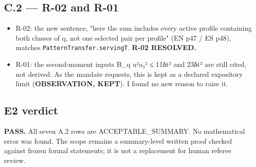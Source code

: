 \documentclass[
]{article}
\providecommand{\tightlist}{%
  \setlength{\itemsep}{0pt}\setlength{\parskip}{0pt}}
\begin{document}
\subsection{C.2 --- R-02 and R-01}\label{c2--r-02-and-r-01}

\begin{itemize}
\tightlist
\item
  R-02: the new sentence, "here the sum includes every active profile
  containing both classes of q, not one selected pair per profile" (EN
  p47 / ES p48), matches \texttt{PatternTransfer.servingT}. \textbf{R-02
  RESOLVED.}
\item
  R-01: the second-moment inputs B\_q u²a₃² ≤ 11δt² and 23δt² are still
  cited, not derived. As the mandate requests, this is kept as a
  declared expository limit (\textbf{OBSERVATION, KEPT}). I found no new
  reason to raise it.
\end{itemize}

\subsection{E2 verdict}\label{e2-verdict}

\textbf{PASS.} All seven A.2 rows are ACCEPTABLE\_SUMMARY. No
mathematical error was found. The scope remains a summary-level written
proof checked against frozen formal statements; it is not a replacement
for human referee review.
\end{document}
